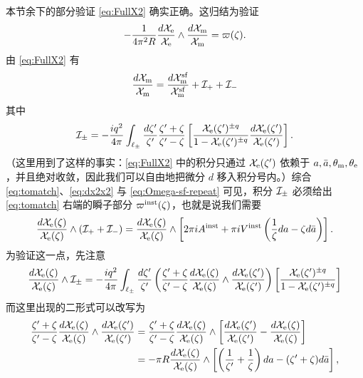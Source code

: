 本节余下的部分验证 \eqref{eq:FullX2} 确实正确。这归结为验证
\begin{equation} \label{eq:tomatch}
- \frac{1}{4 \pi^2 R}\frac{d \mathcal{X}_{\mathrm{e}}}{\mathcal{X}_{\mathrm{e}}} \wedge \frac{d \mathcal{X}_{\mathrm{m}}}{\mathcal{X}_{\mathrm{m}}} = \varpi(\zeta).
\end{equation}
由 \eqref{eq:FullX2} 有
\begin{equation} \label{eq:dx2x2}
\frac{d \mathcal{X}_{\mathrm{m}}}{\mathcal{X}_{\mathrm{m}}} = \frac{d \mathcal{X}^{\mathrm{sf}}_{\mathrm{m}}}{\mathcal{X}^{\mathrm{sf}}_{\mathrm{m}}} + \mathcal{I}_+ + \mathcal{I}_-
\end{equation}
其中
\begin{equation} \label{eq:ipm}
\mathcal{I}_\pm = -\frac{i q^2}{4\pi} \int_{\ell_\pm} \frac{d \zeta'}{\zeta'}
\frac{\zeta' + \zeta}{\zeta' - \zeta} \left[ \frac{\mathcal{X}_{\mathrm{e}}(\zeta')^{\pm q}}{1-\mathcal{X}_{\mathrm{e}}(\zeta')^{\pm q}} \frac{d\mathcal{X}_{\mathrm{e}}(\zeta')}{\mathcal{X}_{\mathrm{e}}(\zeta')}\right].
\end{equation}
（这里用到了这样的事实：\eqref{eq:FullX2} 中的积分只通过 $\mathcal{X}_{\mathrm{e}}(\zeta')$ 依赖于 $a,\bar a,\theta_{\mathrm{m}},\theta_{\mathrm{e}}$，并且绝对收敛，因此我们可以自由地把微分 $d$ 移入积分号内。）综合 \eqref{eq:tomatch}、\eqref{eq:dx2x2} 与 \eqref{eq:Omega-sf-repeat} 可见，积分 $\mathcal{I}_\pm$ 必须给出 \eqref{eq:tomatch} 右端的瞬子部分 $\varpi^{\mathrm{inst}}(\zeta)$，也就是说我们需要
\begin{equation} \label{eq:intermediate}
\frac{d \mathcal{X}_{\mathrm{e}}(\zeta)}{\mathcal{X}_{\mathrm{e}}(\zeta)} \wedge (\mathcal{I}_+ + \mathcal{I}_-) = \frac{d \mathcal{X}_{\mathrm{e}}(\zeta)}{\mathcal{X}_{\mathrm{e}}(\zeta)} \wedge \left[ 2 \pi i A^{\mathrm{inst}} + \pi i V^{\mathrm{inst}} \left(\frac{1}{\zeta} da - \zeta d\bar{a}\right)\right].
\end{equation}
为验证这一点，先注意
\begin{equation}
\frac{d \mathcal{X}_{\mathrm{e}}(\zeta)}{\mathcal{X}_{\mathrm{e}}(\zeta)} \wedge \mathcal{I}_\pm = -\frac{i q^2}{4 \pi} \int_{\ell_\pm} \frac{d \zeta'}{\zeta'}
 \left( \frac{\zeta' + \zeta}{\zeta' - \zeta} \frac{d \mathcal{X}_{\mathrm{e}}(\zeta)}{\mathcal{X}_{\mathrm{e}}(\zeta)} \wedge \frac{d\mathcal{X}_{\mathrm{e}}(\zeta')}{\mathcal{X}_{\mathrm{e}}(\zeta')} \right) \left[ \frac{\mathcal{X}_{\mathrm{e}}(\zeta')^{\pm q}}{1-\mathcal{X}_{\mathrm{e}}(\zeta')^{\pm q}} \right]
\end{equation}
而这里出现的二形式可以改写为
\begin{align}\label{eq:rearrange}
\frac{\zeta' + \zeta}{\zeta' - \zeta} \frac{d \mathcal{X}_{\mathrm{e}}(\zeta)}{\mathcal{X}_{\mathrm{e}}(\zeta)} \wedge \frac{d \mathcal{X}_{\mathrm{e}}(\zeta')}{\mathcal{X}_{\mathrm{e}}(\zeta')} &=
\frac{\zeta' + \zeta}{\zeta' - \zeta} \frac{d \mathcal{X}_{\mathrm{e}}(\zeta)}{\mathcal{X}_{\mathrm{e}}(\zeta)} \wedge \left[\frac{d \mathcal{X}_{\mathrm{e}}(\zeta')}{\mathcal{X}_{\mathrm{e}}(\zeta')}-\frac{d \mathcal{X}_{\mathrm{e}}(\zeta)}{\mathcal{X}_{\mathrm{e}}(\zeta)}\right]\\
&=  - \pi R \frac{d \mathcal{X}_{\mathrm{e}}(\zeta)}{\mathcal{X}_{\mathrm{e}}(\zeta)} \wedge \left[\left(\frac{1}{\zeta'} + \frac{1}{\zeta}\right) da - (\zeta'+\zeta)d\bar a\right],
\end{align}
